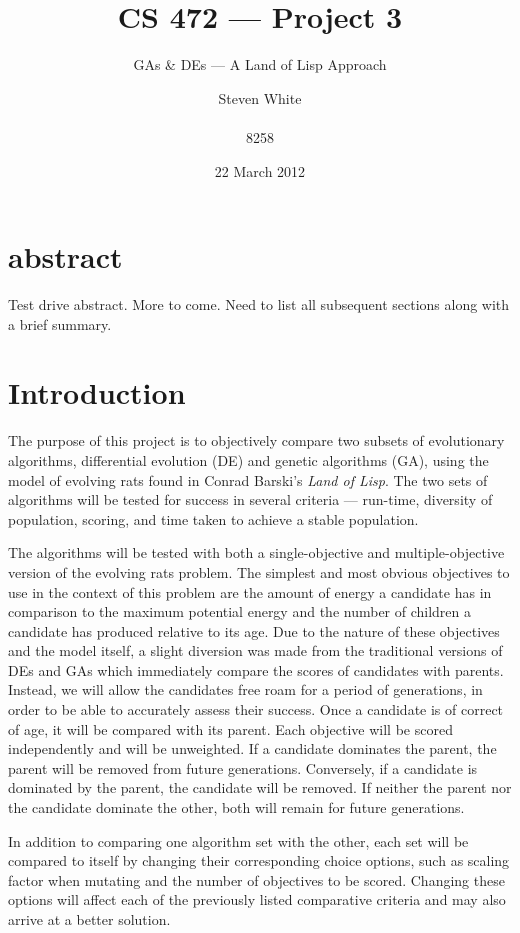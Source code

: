 \documentclass{sig-alternate}
\title{CS 472 --- Project 3}
\subtitle {GAs \& DEs --- A Land of Lisp Approach}
\author{
\alignauthor
Steven White \\
  \email{swhite24@mix.wvu.edu}\\
  8258
}
\begin{document}
\date{22 March 2012}

\maketitle
\section{abstract}
Test drive abstract. More to come.  Need to list all subsequent
sections along with a brief summary.

\section{Introduction}
The purpose of this project is to objectively compare two subsets of evolutionary algorithms, differential evolution (DE) and genetic algorithms (GA), using the model of evolving rats found in Conrad Barski's \emph{Land of Lisp}.  The two sets of algorithms will be tested for success in several criteria --- run-time, diversity of population, scoring, and time taken to achieve a stable population.

The algorithms will be tested with both a single-objective and multiple-objective version of the evolving rats problem.  The simplest and most obvious objectives to use in the context of this problem are the amount of energy a candidate has in comparison to the maximum potential energy and the number of children a candidate has produced relative to its age.  Due to the nature of these objectives and the model itself, a slight diversion was made from the traditional versions of DEs and GAs which immediately compare the scores of candidates with parents.  Instead, we will allow the candidates free roam for a period of generations, in order to be able to accurately assess their success.  Once a candidate is of correct of age, it will be compared with its parent.  Each objective will be scored independently and will be unweighted.  If a candidate dominates the parent, the parent will be removed from future generations.  Conversely, if a candidate is dominated by the parent, the candidate will be removed.  If neither the parent nor the candidate dominate the other, both will remain for future generations.

In addition to comparing one algorithm set with the other, each set will be compared to itself by changing their corresponding choice options, such as scaling factor when mutating and the number of objectives to be scored.  Changing these options will affect each of the previously listed comparative criteria and may also arrive at a better solution.
\end{document}
